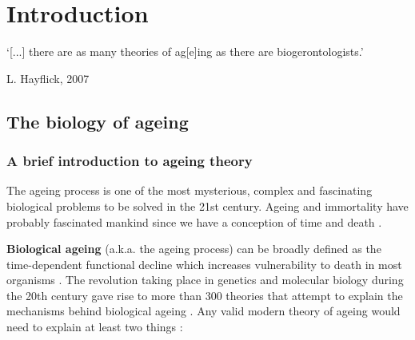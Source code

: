 
\chapter{Introduction}  \label{c:1} %

\ifpdf
    \graphicspath{{Chapter1/Figs/Raster/}{Chapter1/Figs/PDF/}{Chapter1/Figs/}}
\else
    \graphicspath{{Chapter1/Figs/Vector/}{Chapter1/Figs/}}
\fi



\epigraph{`[...] there are as many theories of ag[e]ing as there are biogerontologists.'}{L. Hayflick, 2007 \cite{Hayflick2007}}

\section{The biology of ageing} %

\subsection{A brief introduction to ageing theory}

The ageing process is one of the most mysterious, complex and fascinating biological problems to be solved in the 21st century. Ageing and immortality have probably fascinated mankind since we have a conception of time and death \cite{Renfrew2016}. 

\bigskip

\textbf{Biological ageing} (\acrshort{a.k.a.} the ageing process) can be broadly defined as the time-dependent functional decline which increases vulnerability to death in most organisms \cite{Lopez-Otin2013}. The revolution taking place in genetics and molecular biology during the 20th century gave rise to more than 300 theories that attempt to explain the mechanisms behind biological ageing \cite{Medvedev1990}. Any valid modern theory of ageing would need to explain at least two things \cite{Medvedev1990}:

